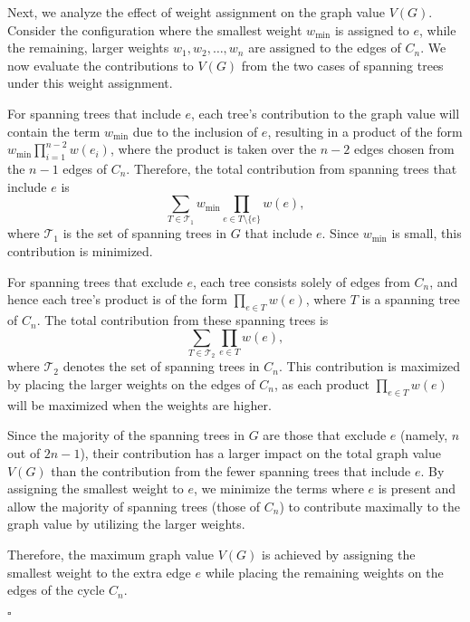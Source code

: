 \documentclass{article}
\begin{document}
Next, we analyze the effect of weight assignment on the graph value \( V(G) \). Consider the configuration where the smallest weight \( w_{\min} \) is assigned to \( e \), while the remaining, larger weights \( w_1, w_2, \ldots, w_n \) are assigned to the edges of \( C_n \). We now evaluate the contributions to \( V(G) \) from the two cases of spanning trees under this weight assignment.

For spanning trees that include \( e \), each tree’s contribution to the graph value will contain the term \( w_{\min} \) due to the inclusion of \( e \), resulting in a product of the form \( w_{\min} \prod_{i=1}^{n-2} w(e_i) \), where the product is taken over the \( n - 2 \) edges chosen from the \( n-1 \) edges of \( C_n \). Therefore, the total contribution from spanning trees that include \( e \) is
\[
\sum_{T \in \mathcal{T}_1} w_{\min} \prod_{e \in T \setminus \{e\}} w(e),
\]
where \( \mathcal{T}_1 \) is the set of spanning trees in \( G \) that include \( e \). Since \( w_{\min} \) is small, this contribution is minimized.

For spanning trees that exclude \( e \), each tree consists solely of edges from \( C_n \), and hence each tree’s product is of the form \( \prod_{e \in T} w(e) \), where \( T \) is a spanning tree of \( C_n \). The total contribution from these spanning trees is
\[
\sum_{T \in \mathcal{T}_2} \prod_{e \in T} w(e),
\]
where \( \mathcal{T}_2 \) denotes the set of spanning trees in \( C_n \). This contribution is maximized by placing the larger weights on the edges of \( C_n \), as each product \( \prod_{e \in T} w(e) \) will be maximized when the weights are higher.

Since the majority of the spanning trees in \( G \) are those that exclude \( e \) (namely, \( n \) out of \( 2n - 1 \)), their contribution has a larger impact on the total graph value \( V(G) \) than the contribution from the fewer spanning trees that include \( e \). By assigning the smallest weight to \( e \), we minimize the terms where \( e \) is present and allow the majority of spanning trees (those of \( C_n \)) to contribute maximally to the graph value by utilizing the larger weights.

Therefore, the maximum graph value \( V(G) \) is achieved by assigning the smallest weight to the extra edge \( e \) while placing the remaining weights on the edges of the cycle \( C_n \).

\(\square\)
\end{document}
